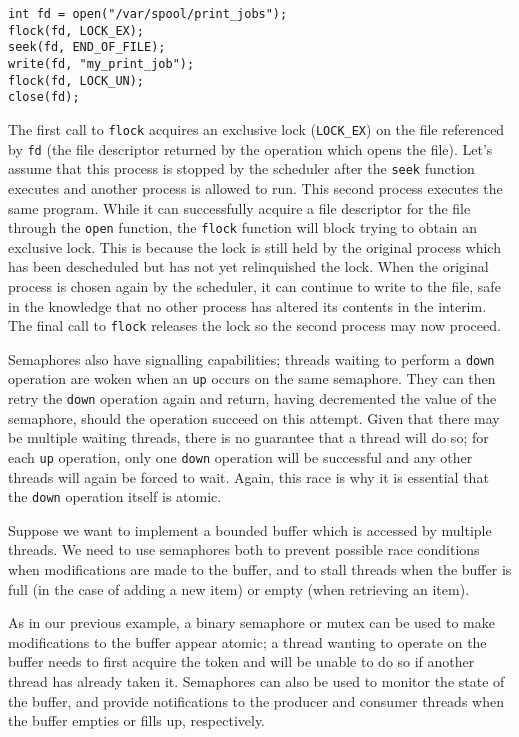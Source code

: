 \begin{verbatim}
int fd = open("/var/spool/print_jobs");
flock(fd, LOCK_EX);
seek(fd, END_OF_FILE);
write(fd, "my_print_job");
flock(fd, LOCK_UN);
close(fd);
\end{verbatim}

The first call to \texttt{flock} acquires an exclusive lock
(\texttt{LOCK\_EX}) on the file referenced by \texttt{fd} (the file
descriptor returned by the operation which opens the file).  Let's
assume that this process is stopped by the scheduler after the
\texttt{seek} function executes and another process is allowed to run.
This second process executes the same program.  While it can
successfully acquire a file descriptor for the file through the
\texttt{open} function, the \texttt{flock} function will block trying
to obtain an exclusive lock.  This is because the lock is still held
by the original process which has been descheduled but has not yet
relinquished the lock.  When the original process is chosen again by
the scheduler, it can continue to write to the file, safe in the
knowledge that no other process has altered its contents in the
interim.  The final call to \texttt{flock} releases the lock so the
second process may now proceed.

Semaphores also have signalling capabilities; threads waiting to
perform a \texttt{down} operation are woken when an \texttt{up} occurs on the same
semaphore.  They can then retry the \texttt{down} operation again and return,
having decremented the value of the semaphore, should the operation
succeed on this attempt.  Given that there may be multiple waiting
threads, there is no guarantee that a thread will do so; for each \texttt{up}
operation, only one \texttt{down} operation will be successful and any other
threads will again be forced to wait.  Again, this race is why it is
essential that the \texttt{down} operation itself is atomic.

Suppose we want to implement a bounded buffer which is accessed by
multiple threads.  We need to use semaphores both to prevent possible
race conditions when modifications are made to the buffer, and to
stall threads when the buffer is full (in the case of adding a new
item) or empty (when retrieving an item).

As in our previous example, a binary semaphore or mutex can be used to
make modifications to the buffer appear atomic; a thread wanting to
operate on the buffer needs to first acquire the token and will be
unable to do so if another thread has already taken it.  Semaphores
can also be used to monitor the state of the buffer, and provide
notifications to the producer and consumer threads when the buffer
empties or fills up, respectively.

